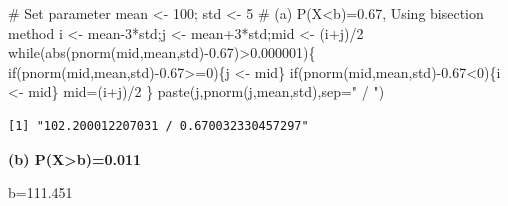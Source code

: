 \documentclass[
  a4paper,
  DIV=11,
  numbers=noendperiod]{scrreprt}
\newenvironment{Shaded}{\begin{snugshade}}{\end{snugshade}}
\newcommand{\AttributeTok}[1]{\textcolor[rgb]{0.40,0.45,0.13}{#1}}
\newcommand{\CommentTok}[1]{\textcolor[rgb]{0.37,0.37,0.37}{#1}}
\newcommand{\ControlFlowTok}[1]{\textcolor[rgb]{0.00,0.23,0.31}{#1}}
\newcommand{\DecValTok}[1]{\textcolor[rgb]{0.68,0.00,0.00}{#1}}
\newcommand{\FloatTok}[1]{\textcolor[rgb]{0.68,0.00,0.00}{#1}}
\newcommand{\FunctionTok}[1]{\textcolor[rgb]{0.28,0.35,0.67}{#1}}
\newcommand{\NormalTok}[1]{\textcolor[rgb]{0.00,0.23,0.31}{#1}}
\newcommand{\OtherTok}[1]{\textcolor[rgb]{0.00,0.23,0.31}{#1}}
\newcommand{\SpecialCharTok}[1]{\textcolor[rgb]{0.37,0.37,0.37}{#1}}
\newcommand{\StringTok}[1]{\textcolor[rgb]{0.13,0.47,0.30}{#1}}
\begin{document}
\begin{Shaded}
\begin{Highlighting}[]
\CommentTok{\# Set parameter}
\NormalTok{mean }\OtherTok{\textless{}{-}} \DecValTok{100}\NormalTok{; std }\OtherTok{\textless{}{-}} \DecValTok{5}
\CommentTok{\# (a) P(X\textless{}b)=0.67, Using bisection method}
\NormalTok{i }\OtherTok{\textless{}{-}}\NormalTok{ mean}\DecValTok{{-}3}\SpecialCharTok{*}\NormalTok{std;j }\OtherTok{\textless{}{-}}\NormalTok{ mean}\SpecialCharTok{+}\DecValTok{3}\SpecialCharTok{*}\NormalTok{std;mid }\OtherTok{\textless{}{-}}\NormalTok{ (i}\SpecialCharTok{+}\NormalTok{j)}\SpecialCharTok{/}\DecValTok{2}
\ControlFlowTok{while}\NormalTok{(}\FunctionTok{abs}\NormalTok{(}\FunctionTok{pnorm}\NormalTok{(mid,mean,std)}\SpecialCharTok{{-}}\FloatTok{0.67}\NormalTok{)}\SpecialCharTok{\textgreater{}}\FloatTok{0.000001}\NormalTok{)\{}
  \ControlFlowTok{if}\NormalTok{(}\FunctionTok{pnorm}\NormalTok{(mid,mean,std)}\SpecialCharTok{{-}}\FloatTok{0.67}\SpecialCharTok{\textgreater{}=}\DecValTok{0}\NormalTok{)\{j }\OtherTok{\textless{}{-}}\NormalTok{ mid\}}
  \ControlFlowTok{if}\NormalTok{(}\FunctionTok{pnorm}\NormalTok{(mid,mean,std)}\SpecialCharTok{{-}}\FloatTok{0.67}\SpecialCharTok{\textless{}}\DecValTok{0}\NormalTok{)\{i }\OtherTok{\textless{}{-}}\NormalTok{ mid\}}
\NormalTok{  mid}\OtherTok{=}\NormalTok{(i}\SpecialCharTok{+}\NormalTok{j)}\SpecialCharTok{/}\DecValTok{2}
\NormalTok{\}}
\FunctionTok{paste}\NormalTok{(j,}\FunctionTok{pnorm}\NormalTok{(j,mean,std),}\AttributeTok{sep=}\StringTok{" / "}\NormalTok{)}
\end{Highlighting}
\end{Shaded}

\begin{verbatim}
[1] "102.200012207031 / 0.670032330457297"
\end{verbatim}

\textbf{(b) P(X\textgreater b)=0.011}

b=111.451
\end{document}
